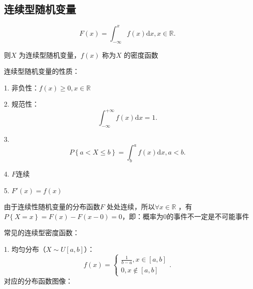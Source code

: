 \subsection{连续型随机变量}%
\label{sub:连续型随机变量}
\begin{defi}
    \[
        F\left( x \right) =\int_{-\infty}^{x} f\left( x \right) \mathrm{d}x,x\in \mathbb{R}
    .\] 

    则$X$ 为连续型随机变量，$f\left( x \right) $ 称为$X$ 的密度函数
\end{defi}
连续型随机变量的性质：

1. 非负性：$f\left( x \right) \ge 0, x\in \mathbb{R}$

2. 规范性： \[
    \int_{-\infty}^{+\infty} f\left( x \right) \mathrm{d}x =1
.\]

3. \[
    P\left\{ a<X\le b \right\} =\int_{b}^{a}f\left( x \right) \mathrm{d}x, a<b
.\] 

4. $F$连续

5. $F'\left( x \right) =f\left( x \right) $

\begin{notation}
    由于连续性随机变量的分布函数$F$ 处处连续，所以$\forall x\in \mathbb{R}$ ，有$P\left\{ X=x \right\} =F\left( x \right) -F\left( x-0 \right) =0$，即：概率为0的事件不一定是不可能事件
\end{notation}
\begin{eg}
    
\end{eg}
常见的连续型密度函数：

1. 均匀分布（$X\sim U\left[ a,b \right] $）：\[
    f\left( x \right) =\begin{cases}
        {\frac{1}{b-a}},x\in \left[ a,b \right] \\
        0,x \not\in \left[ a,b \right] 
    \end{cases}
.\] 
对应的分布函数图像：
\begin{center}
\end{center}

